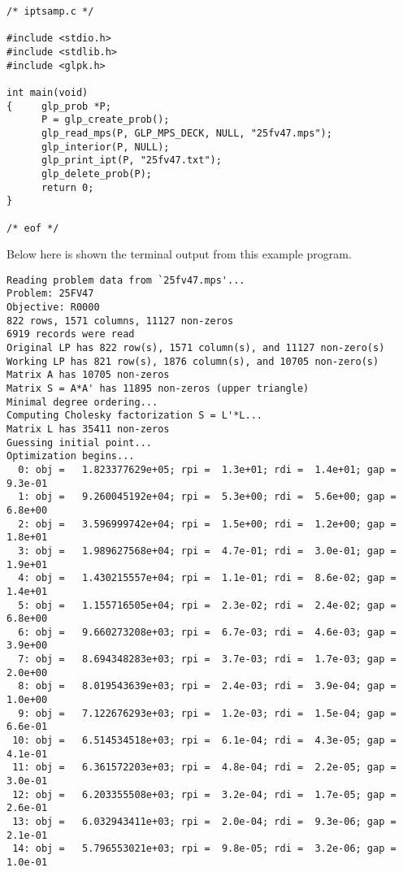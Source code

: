\begin{footnotesize}
\begin{verbatim}
/* iptsamp.c */

#include <stdio.h>
#include <stdlib.h>
#include <glpk.h>

int main(void)
{     glp_prob *P;
      P = glp_create_prob();
      glp_read_mps(P, GLP_MPS_DECK, NULL, "25fv47.mps");
      glp_interior(P, NULL);
      glp_print_ipt(P, "25fv47.txt");
      glp_delete_prob(P);
      return 0;
}

/* eof */
\end{verbatim}
\end{footnotesize}

\noindent
Below here is shown the terminal output from this example program.

\begin{footnotesize}
\begin{verbatim}
Reading problem data from `25fv47.mps'...
Problem: 25FV47
Objective: R0000
822 rows, 1571 columns, 11127 non-zeros
6919 records were read
Original LP has 822 row(s), 1571 column(s), and 11127 non-zero(s)
Working LP has 821 row(s), 1876 column(s), and 10705 non-zero(s)
Matrix A has 10705 non-zeros
Matrix S = A*A' has 11895 non-zeros (upper triangle)
Minimal degree ordering...
Computing Cholesky factorization S = L'*L...
Matrix L has 35411 non-zeros
Guessing initial point...
Optimization begins...
  0: obj =   1.823377629e+05; rpi =  1.3e+01; rdi =  1.4e+01; gap =  9.3e-01
  1: obj =   9.260045192e+04; rpi =  5.3e+00; rdi =  5.6e+00; gap =  6.8e+00
  2: obj =   3.596999742e+04; rpi =  1.5e+00; rdi =  1.2e+00; gap =  1.8e+01
  3: obj =   1.989627568e+04; rpi =  4.7e-01; rdi =  3.0e-01; gap =  1.9e+01
  4: obj =   1.430215557e+04; rpi =  1.1e-01; rdi =  8.6e-02; gap =  1.4e+01
  5: obj =   1.155716505e+04; rpi =  2.3e-02; rdi =  2.4e-02; gap =  6.8e+00
  6: obj =   9.660273208e+03; rpi =  6.7e-03; rdi =  4.6e-03; gap =  3.9e+00
  7: obj =   8.694348283e+03; rpi =  3.7e-03; rdi =  1.7e-03; gap =  2.0e+00
  8: obj =   8.019543639e+03; rpi =  2.4e-03; rdi =  3.9e-04; gap =  1.0e+00
  9: obj =   7.122676293e+03; rpi =  1.2e-03; rdi =  1.5e-04; gap =  6.6e-01
 10: obj =   6.514534518e+03; rpi =  6.1e-04; rdi =  4.3e-05; gap =  4.1e-01
 11: obj =   6.361572203e+03; rpi =  4.8e-04; rdi =  2.2e-05; gap =  3.0e-01
 12: obj =   6.203355508e+03; rpi =  3.2e-04; rdi =  1.7e-05; gap =  2.6e-01
 13: obj =   6.032943411e+03; rpi =  2.0e-04; rdi =  9.3e-06; gap =  2.1e-01
 14: obj =   5.796553021e+03; rpi =  9.8e-05; rdi =  3.2e-06; gap =  1.0e-01

\end{verbatim}
\end{footnotesize}
